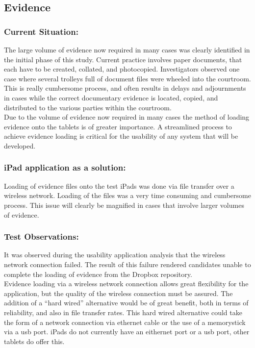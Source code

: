  \subsection{Evidence}
 \subsubsection{Current Situation:}
The large volume of evidence now required in many cases was clearly identified in the initial phase of this study. Current practice involves paper documents, that each have to be created, collated, and photocopied. Investigators observed one case where several trolleys full of document files were wheeled into the courtroom. This is really cumbersome process, and often results in delays and adjournments in cases while the correct documentary evidence is located, copied, and distributed to the various parties within the courtroom.\\
Due to the volume of evidence now required in many cases the method of loading evidence onto the tablets is of greater importance. A streamlined process to achieve evidence loading is critical for the usability of any system that will be developed.\\
\subsubsection{iPad application as a solution:}
Loading of evidence files onto the test iPads was done via file transfer over a wireless network. Loading of the files was a very time consuming and cumbersome process. This issue will clearly be magnified in cases that involve larger volumes of evidence.\\
\subsubsection{Test Observations:}
It was observed during the usability application analysis that the wireless network connection failed. The result of this failure rendered candidates unable to complete the loading of evidence from the Dropbox repository.\\
Evidence loading via a wireless network connection allows great flexibility for the application, but the quality of the wireless connection must be assured. The addition of a ``hard wired'' alternative would be of great benefit, both in terms of reliability, and also in file transfer rates. This hard wired alternative could take the form of a network connection via ethernet cable or the use of a memorystick via a usb port. iPads do not currently have an eithernet port or a usb port, other tablets do offer this.\\
